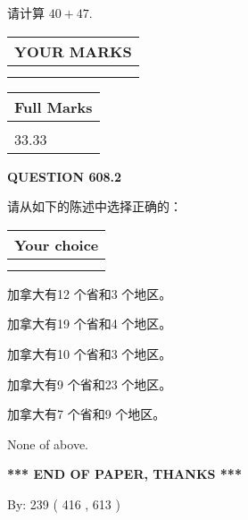 \documentclass{ctexart}
\begin{document}
  
 
请计算 $ %
40 +  %
47 $.
 

 

 
  
\vspace{0.2in}
  
\noindent\begin{tabular}{|l|}
\hline
 YOUR MARKS  \\
\hline
 \\ 
 \\ 
\hline
\end{tabular}
\hspace{0.05in} \begin{tabular}{|l|}
\hline
 Full Marks  \\
\hline
 \\ 
33.33 \\
\hline
\end{tabular}
{\textbf{\Large{QUESTION
608.2 
}}}
  
  
请从如下的陈述中选择正确的：
  
  
\noindent\hspace{3.0in} \begin{tabular}{|l|}
\hline
Your choice \\
\hline
 \\ 
 \\ 
\hline
\end{tabular}
  
  
 
 
加拿大有12 个省和3 个地区。
 
 
加拿大有19 个省和4 个地区。
 
 
加拿大有10 个省和3 个地区。
 
 
加拿大有9 个省和23 个地区。
 
 
加拿大有7 个省和9 个地区。
 
 
 None of above.
 
 
   
   
 \vspace{0.2in}
 
   
   
   
   
\vspace{1.0in} 
{\textbf{\large{ *** END OF PAPER, THANKS *** }}} 
   
   
\hspace{1.0in} By: 
 239 ( 416 ,  613 )
   
\end{document}
